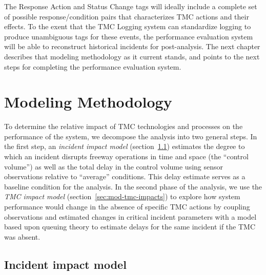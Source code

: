 \documentclass[12pt]{report}
\begin{document}
The {\sc Response Action} and {\sc Status Change} tags will ideally include a
complete set of possible response/condition pairs that characterizes TMC actions
and their effects.  To the exent that the TMC Logging system can standardize
logging to produce unambiguous tags for these events, the performance evaluation
system will be able to reconstruct historical incidents for post-analysis.  The
next chapter describes that modeling methodology as it current stands, and
points to the next steps for completing the performance evaluation system.


\chapter{Modeling Methodology}
\label{sec:method}

To determine the relative impact of TMC technologies and processes on the
performance of the system, we decompose the analysis into two general steps.  In
the first step, an \emph{incident impact model}
(section~\ref{sec:incident-impact-model}) estimates the degree to which an
incident disrupts freeway operations in time and space (the ``control volume'')
as well as the total delay in the control volume using sensor observations
relative to ``average'' conditions.  This delay estimate serves as a baseline
condition for the analysis.  In the second phase of the analysis, we use the
\emph{TMC impact model} (section~\ref{sec:mod-tmc-impacts}) to explore how
system performance would change in the absence of specific TMC actions by
coupling observations and estimated changes in critical incident parameters with
a model based upon queuing theory to estimate delays for the same incident if
the TMC was absent.


\section{Incident impact model}
\label{sec:incident-impact-model}
\end{document}
